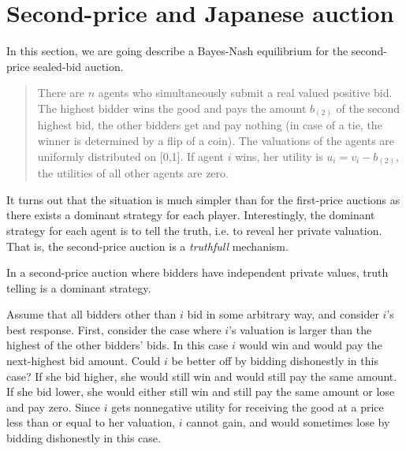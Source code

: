 

\section{Second-price and Japanese auction}
\label{sec:auc:4}
In this section, we are going describe a Bayes-Nash equilibrium for the second-price sealed-bid auction.

\begin{quote}
There are $n$ agents who simultaneously submit a real valued positive bid. The highest bidder wins the good and pays the amount $b_{(2)}$ of the second highest bid, the other bidders get and pay nothing (in case of a tie, the winner is determined by a flip of a coin).
%
The valuations of the agents are uniformly distributed on [0,1]. If agent $i$ wins, her utility is $u_i = v_i - b_{(2)}$, the utilities of all other agents are zero.
\end{quote}

 It turns out that the situation is much simpler than for the first-price auctions as there exists a dominant strategy for each player. Interestingly, the dominant strategy for each agent is to tell the truth, i.e. to reveal her private valuation. That is, the second-price auction is a \emph{truthfull} mechanism.

\begin{theorem}
In a second-price auction where bidders have independent private values, truth telling is a dominant strategy.
\end{theorem}

Assume that all bidders other than $i$ bid in some arbitrary way, and consider $i$'s best response. First, consider the case where $i$'s valuation is larger
than the highest of the other bidders' bids. In this case $i$ would win and would pay the next-highest bid amount. Could $i$ be better off by bidding dishonestly in this case? If she bid higher, she would still win
and would still pay the same amount. 
If she bid lower, she would either still win and still pay the same amount or lose and pay zero.
Since $i$ gets nonnegative utility for receiving the good at a price less than or equal to her valuation, $i$ cannot gain, and would sometimes lose by bidding dishonestly in this case. 


